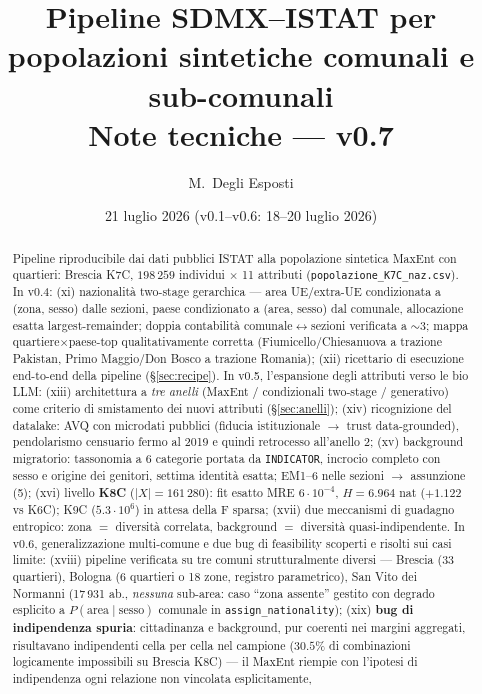 \documentclass[11pt,a4paper]{article}
\title{\textbf{Pipeline SDMX--ISTAT per popolazioni sintetiche comunali e sub-comunali}\\[2mm]
\large Note tecniche --- v0.7}
\author{M.~Degli Esposti}
\date{21 luglio 2026 \quad (v0.1--v0.6: 18--20 luglio 2026)}
\newcommand{\code}[1]{\texttt{#1}}
\begin{document}
\maketitle

\begin{abstract}
\noindent
Pipeline riproducibile dai dati pubblici ISTAT alla popolazione sintetica
MaxEnt con quartieri: Brescia K7C, $198\,259$ individui $\times$ 11 attributi
(\code{popolazione\_K7C\_naz.csv}). In v0.4: (xi) nazionalit\`a two-stage
gerarchica --- area UE/extra-UE condizionata a (zona, sesso) dalle sezioni,
paese condizionato a (area, sesso) dal comunale, allocazione esatta
largest-remainder; doppia contabilit\`a comunale$\leftrightarrow$sezioni
verificata a $\sim3$\textperthousand; mappa quartiere$\times$paese-top
qualitativamente corretta (Fiumicello/Chiesanuova a trazione Pakistan,
Primo Maggio/Don Bosco a trazione Romania); (xii) ricettario di esecuzione
end-to-end della pipeline (\S\ref{sec:recipe}). In v0.5, l'espansione degli
attributi verso le bio LLM: (xiii) architettura a \emph{tre anelli}
(MaxEnt / condizionali two-stage / generativo) come criterio di smistamento
dei nuovi attributi (\S\ref{sec:anelli}); (xiv) ricognizione del datalake:
AVQ con microdati pubblici (fiducia istituzionale $\to$ trust data-grounded),
pendolarismo censuario fermo al 2019 e quindi retrocesso all'anello 2;
(xv) background migratorio: tassonomia a 6 categorie portata da
\code{INDICATOR}, incrocio completo con sesso e origine dei genitori,
settima identit\`a esatta; EM1--6 nelle sezioni $\to$ assunzione (5);
(xvi) livello \textbf{K8C} ($|X|=161\,280$): fit esatto MRE
$6\cdot10^{-4}$, $H=6.964$ nat ($+1.122$ vs K6C); K9C ($5.3\cdot10^6$)
in attesa della F sparsa; (xvii) due meccanismi di guadagno entropico:
zona $=$ diversit\`a correlata, background $=$ diversit\`a
quasi-indipendente. In v0.6, generalizzazione multi-comune e due bug di
feasibility scoperti e risolti sui casi limite: (xviii) pipeline verificata
su tre comuni strutturalmente diversi --- Brescia (33 quartieri), Bologna
(6 quartieri o 18 zone, registro parametrico), San Vito dei Normanni
(17\,931 ab., \emph{nessuna} sub-area: caso ``zona assente'' gestito con
degrado esplicito a $P(\text{area}\mid\text{sesso})$ comunale in
\code{assign\_nationality}); (xix) \textbf{bug di indipendenza spuria}:
cittadinanza e background, pur coerenti nei margini aggregati, risultavano
indipendenti cella per cella nel campione ($30.5\%$ di combinazioni
logicamente impossibili su Brescia K8C) --- il MaxEnt riempie con
l'ipotesi di indipendenza ogni relazione non vincolata esplicitamente,

\end{abstract}
\end{document}
